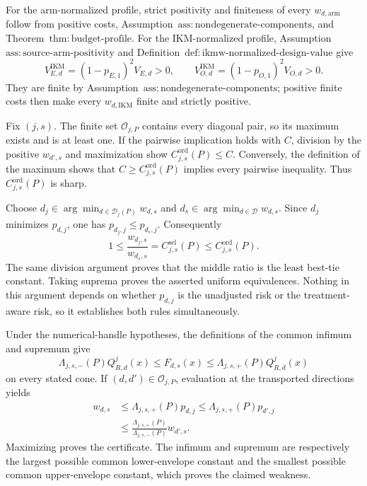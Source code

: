 For the arm-normalized profile, strict positivity and finiteness of every \(w_{d,\mathrm{arm}}\) follow from positive costs, Assumption~\(\mathrm{ass{:}nondegenerate\text{-}components}\), and Theorem~\(\mathrm{thm{:}budget\text{-}profile}\).  For the IKM-normalized profile, Assumption~\(\mathrm{ass{:}source\text{-}arm\text{-}positivity}\) and Definition~\(\mathrm{def{:}ikmw\text{-}normalized\text{-}design\text{-}value}\) give
\[
 V_{E,d}^{\mathrm{IKM}}=(1-p_{E,1})^2V_{E,d}>0,
 \qquad
 V_{O,d}^{\mathrm{IKM}}=(1-p_{O,1})^2V_{O,d}>0.
\]
They are finite by Assumption~\(\mathrm{ass{:}nondegenerate\text{-}components}\); positive finite costs then make every \(w_{d,\mathrm{IKM}}\) finite and strictly positive.

Fix \((j,s)\).  The finite set \(\mathcal O_{j,P}\) contains every diagonal pair, so its maximum exists and is at least one.  If the pairwise implication holds with \(C\), division by the positive \(w_{d',s}\) and maximization show \(C_{j,s}^{\mathrm{ord}}(P)\le C\).  Conversely, the definition of the maximum shows that \(C\ge C_{j,s}^{\mathrm{ord}}(P)\) implies every pairwise inequality.  Thus \(C_{j,s}^{\mathrm{ord}}(P)\) is sharp.

Choose \(d_j\in\arg\min_{d\in\mathcal D_j(P)}w_{d,s}\) and \(d_s\in\arg\min_{d\in\mathcal D}w_{d,s}\).  Since \(d_j\) minimizes \(p_{d,j}\), one has \(p_{d_j,j}\le p_{d_s,j}\).  Consequently
\[
 1\le\frac{w_{d_j,s}}{w_{d_s,s}}
 =C_{j,s}^{\mathrm{sel}}(P)
 \le C_{j,s}^{\mathrm{ord}}(P).
\]
The same division argument proves that the middle ratio is the least best-tie constant.  Taking suprema proves the asserted uniform equivalences.  Nothing in this argument depends on whether \(p_{d,j}\) is the unadjusted risk or the treatment-aware risk, so it establishes both rules simultaneously.

Under the numerical-handle hypotheses, the definitions of the common infimum and supremum give
\[
 \Lambda_{j,s,-}(P)Q_{R,d}^{j}(x)
 \le F_{d,s}(x)
 \le\Lambda_{j,s,+}(P)Q_{R,d}^{j}(x)
\]
on every stated cone.  If \((d,d')\in\mathcal O_{j,P}\), evaluation at the transported directions yields
\[
\begin{aligned}
 w_{d,s}
 &\le\Lambda_{j,s,+}(P)p_{d,j}
 \le\Lambda_{j,s,+}(P)p_{d',j}\\
 &\le\frac{\Lambda_{j,s,+}(P)}{\Lambda_{j,s,-}(P)}w_{d',s}.
\end{aligned}
\]
Maximizing proves the certificate.  The infimum and supremum are respectively the largest possible common lower-envelope constant and the smallest possible common upper-envelope constant, which proves the claimed weakness.

